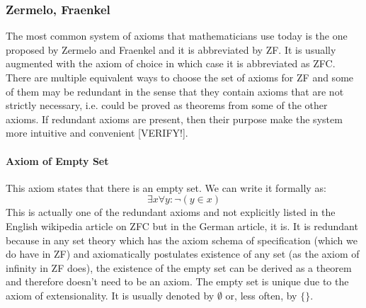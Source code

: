 \subsubsection{Zermelo, Fraenkel}
The most common system of axioms that mathematicians use today is the one proposed by Zermelo and Fraenkel and it is abbreviated by ZF. It is usually augmented with the axiom of choice in which case it is abbreviated as ZFC. There are multiple equivalent ways to choose the set of axioms for ZF and some of them may be redundant in the sense that they contain axioms that are not strictly necessary, i.e. could be proved as theorems from some of the other axioms. If redundant axioms are present, then their purpose make the system more intuitive and convenient [VERIFY!].






\paragraph{Axiom of Empty Set}
This axiom states that there is an empty set. We can write it formally as:
\begin{equation}
\exists x \forall y: \neg (y \in x)
\end{equation}
This is actually one of the redundant axioms and not explicitly listed in the English wikipedia article on ZFC but in the German article, it is. It is redundant because in any set theory which has the axiom schema of specification (which we do have in ZF) and axiomatically postulates existence of any set (as the axiom of infinity in ZF does), the existence of the empty set can be derived as a theorem and therefore doesn't need to be an axiom. The empty set is unique due to the axiom of extensionality. It is usually denoted by $\emptyset$ or, less often, by $\{ \}$.

